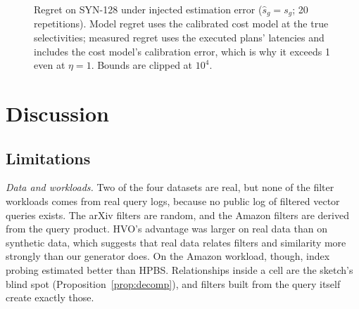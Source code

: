 \documentclass[sigconf,nonacm]{acmart}
\begin{document}
\begin{figure}[!t]
\centering
{}
\caption{Regret on SYN-128 under injected estimation error ($\hat s_g=s_g$; 20 repetitions). Model regret uses the calibrated cost model at the true selectivities; measured regret uses the executed plans' latencies and includes the cost model's calibration error, which is why it exceeds 1 even at $\eta=1$. Bounds are clipped at $10^4$.}
\label{fig:regret}
\end{figure}

\section{Discussion}\label{sec:discussion}
\subsection{Limitations}
\emph{Data and workloads.} Two of the four datasets are real, but none of the filter workloads comes from real query logs, because no public log of filtered vector queries exists. The arXiv filters are random, and the Amazon filters are derived from the query product. HVO's advantage was larger on real data than on synthetic data, which suggests that real data relates filters and similarity more strongly than our generator does. On the Amazon workload, though, index probing estimated better than HPBS. Relationships inside a cell are the sketch's blind spot (Proposition~\ref{prop:decomp}), and filters built from the query itself create exactly those.
\end{document}
